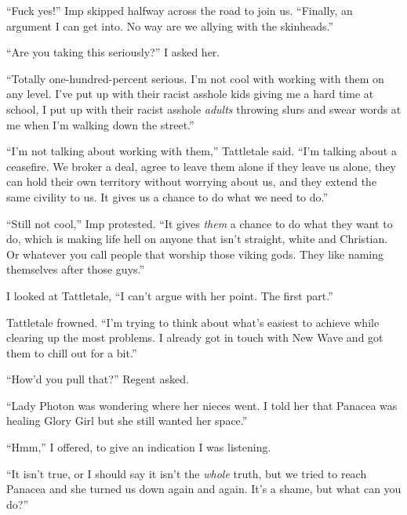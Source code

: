 ``Fuck yes!'' Imp skipped halfway across the road to join us.  ``Finally, an argument I can get into.  No way are we allying with the skinheads.''



``Are you taking this seriously?'' I asked her.



``Totally one-hundred-percent serious.  I'm not cool with working with them on any level.  I've put up with their racist asshole kids giving me a hard time at school, I put up with their racist asshole \emph{adults} throwing slurs and swear words at me when I'm walking down the street.''



``I'm not talking about working with them,'' Tattletale said.  ``I'm talking about a ceasefire.  We broker a deal, agree to leave them alone if they leave us alone, they can hold their own territory without worrying about us, and they extend the same civility to us.  It gives us a chance to do what we need to do.''



``Still not cool,'' Imp protested.  ``It gives \emph{them} a chance to do what they want to do, which is making life hell on anyone that isn't straight, white and Christian.  Or whatever you call people that worship those viking gods.  They like naming themselves after those guys.''



I looked at Tattletale, ``I can't argue with her point.  The first part.''



Tattletale frowned.  ``I'm trying to think about what's easiest to achieve while clearing up the most problems.  I already got in touch with New Wave and got them to chill out for a bit.''



``How'd you pull that?'' Regent asked.



``Lady Photon was wondering where her nieces went.  I told her that Panacea was healing Glory Girl but she still wanted her space.''



``Hmm,'' I offered, to give an indication I was listening.



``It isn't true, or I should say it isn't the \emph{whole} truth, but we tried to reach Panacea and she turned us down again and again.  It's a shame, but what can you do?''



